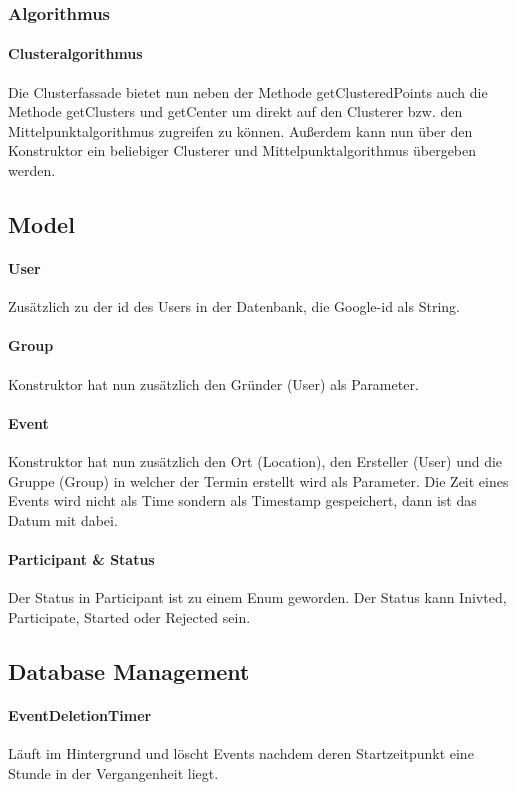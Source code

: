 \documentclass{scrartcl}
\begin{document}
	\subsubsection{Algorithmus}	
	\paragraph{Clusteralgorithmus}
	Die Clusterfassade bietet nun neben der Methode getClusteredPoints auch die Methode getClusters und getCenter um direkt auf den Clusterer bzw. den Mittelpunktalgorithmus zugreifen zu können. Außerdem kann nun über den Konstruktor ein beliebiger Clusterer und Mittelpunktalgorithmus übergeben werden.
	
	\subsection{Model}
	\paragraph{User}
	Zusätzlich zu der id des Users in der Datenbank, die Google-id als String.
	\paragraph{Group}
	Konstruktor hat nun zusätzlich den Gründer (User) als Parameter.
		\paragraph{Event}
	Konstruktor hat nun zusätzlich den Ort (Location), den Ersteller (User) und die Gruppe (Group) in welcher der Termin erstellt wird als Parameter.
	Die Zeit eines Events wird nicht als Time sondern als Timestamp gespeichert, dann ist das Datum mit dabei.

	\paragraph{Participant \& Status}
	Der Status in Participant ist zu einem Enum geworden.
	Der Status kann Inivted, Participate, Started oder Rejected sein.	
	\subsection{Database Management}
	\paragraph{EventDeletionTimer}
	Läuft im Hintergrund und löscht Events nachdem deren Startzeitpunkt eine Stunde in der Vergangenheit liegt.
\end{document}
